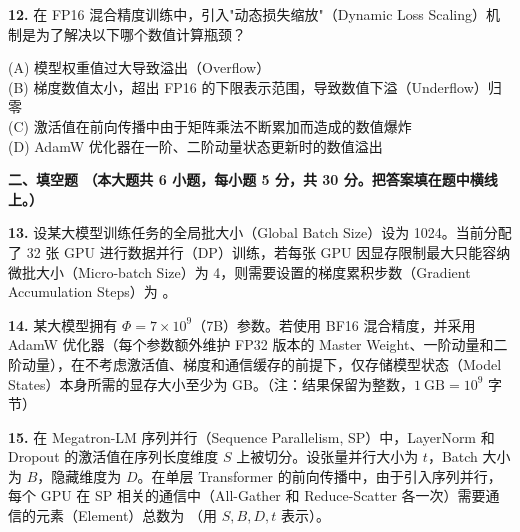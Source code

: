 \documentclass[a4paper]{ctexart}
\newcommand{\bodyfont}{\fontsize{12pt}{16pt}\selectfont}
\begin{document}
\vspace{0.5em}

\noindent\textbf{12.} 在 FP16 混合精度训练中，引入"动态损失缩放"（Dynamic Loss Scaling）机制是为了解决以下哪个数值计算瓶颈？

\noindent\hspace{1em}(A) 模型权重值过大导致溢出（Overflow） \\
\noindent\hspace{1em}(B) 梯度数值太小，超出 FP16 的下限表示范围，导致数值下溢（Underflow）归零 \\
\noindent\hspace{1em}(C) 激活值在前向传播中由于矩阵乘法不断累加而造成的数值爆炸 \\
\noindent\hspace{1em}(D) AdamW 优化器在一阶、二阶动量状态更新时的数值溢出

\newpage

{\bodyfont\heiti\bfseries 二、填空题%
{\bodyfont\songti\bfseries （本大题共 6 小题，每小题 5 分，共 30 分。把答案填在题中横线上。）}}

\vspace{0.5em}

\noindent\textbf{13.} 设某大模型训练任务的全局批大小（Global Batch Size）设为 1024。当前分配了 32 张 GPU 进行数据并行（DP）训练，若每张 GPU 因显存限制最大只能容纳微批大小（Micro-batch Size）为 4，则需要设置的梯度累积步数（Gradient Accumulation Steps）为 \underline{\hspace{2.5cm}}。

\vspace{0.7em}

\noindent\textbf{14.} 某大模型拥有 $\Phi = 7 \times 10^9$（7B）参数。若使用 BF16 混合精度，并采用 AdamW 优化器（每个参数额外维护 FP32 版本的 Master Weight、一阶动量和二阶动量），在不考虑激活值、梯度和通信缓存的前提下，仅存储模型状态（Model States）本身所需的显存大小至少为 \underline{\hspace{2.5cm}} GB。（注：结果保留为整数，$1~\mathrm{GB} = 10^9$ 字节）

\vspace{0.7em}

\noindent\textbf{15.} 在 Megatron-LM 序列并行（Sequence Parallelism, SP）中，LayerNorm 和 Dropout 的激活值在序列长度维度 $S$ 上被切分。设张量并行大小为 $t$，Batch 大小为 $B$，隐藏维度为 $D$。在单层 Transformer 的前向传播中，由于引入序列并行，每个 GPU 在 SP 相关的通信中（All-Gather 和 Reduce-Scatter 各一次）需要通信的元素（Element）总数为 \underline{\hspace{4.5cm}}（用 $S, B, D, t$ 表示）。
\end{document}
